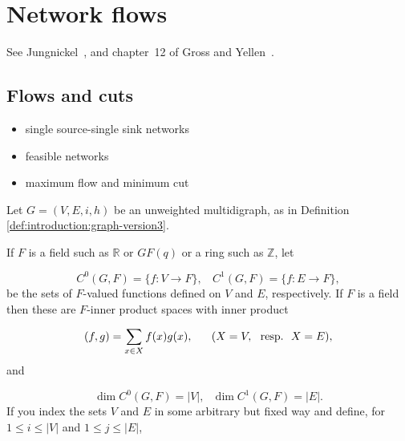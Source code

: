 
\chapter{Network flows}
\label{chap:network_flows}

See Jungnickel~\cite{Jungnickel2008}, and chapter~12 of Gross and
Yellen~\cite{GrossYellen1999}.



\section{Flows and cuts}
\label{section:flows-cuts}

\begin{itemize}
\item single source-single sink networks

\item feasible networks

\item maximum flow and minimum cut
\end{itemize}


Let $G=(V,E,i,h)$ be an unweighted multidigraph, as in
Definition \ref{def:introduction:graph-version3}.

If $F$ is a field such as ${\mathbb{R}}$ or $GF(q)$ or a
ring such as ${\mathbb{Z}}$, let

\[
C^0(G, F)=\{f:V\to F\},\ \ \ \ C^1(G, F)=\{f:E\to F\},
\]
be the sets of $F$-valued functions defined on $V$ and
$E$, respectively.
If $F$ is a field then these are $F$-inner
product spaces with inner product

\begin{equation}
\label{eqn:inner-product}
(f,g)=\sum_{x\in X} f(x)g(x), \ \ \ \ \ (X=V,\ \ {\rm resp.}\ \ X=E),
\end{equation}
and

\[
\dim C^0(G,F)=|V|,\ \ \ \dim C^1(G,F)=|E|.
\]
If you index the sets $V$ and $E$ in some arbitrary but fixed way
and define, for $1\leq i\leq |V|$ and
$1\leq j\leq |E|$,

